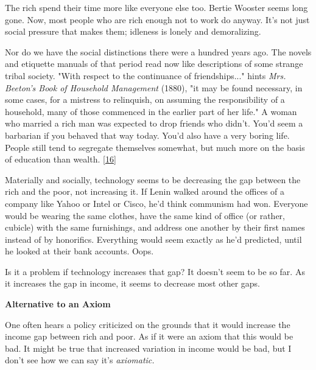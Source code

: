The
                  rich spend their time more like everyone else too. Bertie
                  Wooster seems long gone. Now, most people who are rich enough
                  not to work do anyway. It's not just social pressure that
                  makes them; idleness is lonely and demoralizing.

Nor
                  do we have the social distinctions there were a hundred years
                  ago. The novels and etiquette manuals of that period read now
                  like descriptions of some strange tribal society. "With
                  respect to the continuance of friendships..." hints
                  \emph{Mrs. Beeton's Book of Household Management} (1880), "it
                  may be found necessary, in some cases, for a mistress to
                  relinquish, on assuming the responsibility of a household,
                  many of those commenced in the earlier part of her life." A
                  woman who married a rich man was expected to drop friends who
                  didn't. You'd seem a barbarian if you behaved that way today.
                  You'd also have a very boring life. People still tend to
                  segregate themselves somewhat, but much more on the basis of
                  education than wealth.
                  [\href{\#f16n}{16}]

Materially and socially, technology seems to be
                  decreasing the gap between the rich and the poor, not
                  increasing it. If Lenin walked around the offices of a company
                  like Yahoo or Intel or Cisco, he'd think communism had won.
                  Everyone would be wearing the same clothes, have the same kind
                  of office (or rather, cubicle) with the same furnishings, and
                  address one another by their first names instead of by
                  honorifics. Everything would seem exactly as he'd predicted,
                  until he looked at their bank accounts. Oops.

Is it
                  a problem if technology increases that gap? It doesn't seem to
                  be so far. As it increases the gap in income, it seems to
                  decrease most other gaps.

\textbf{Alternative to an Axiom}

One often hears a policy criticized on the
                  grounds that it would increase the income gap between rich and
                  poor. As if it were an axiom that this would be bad. It might
                  be true that increased variation in income would be bad, but I
                  don't see how we can say it's \emph{axiomatic.}

